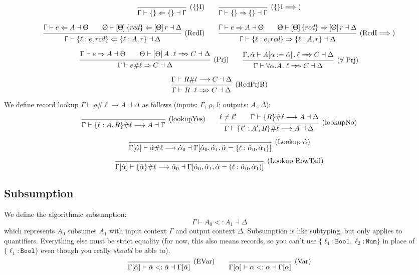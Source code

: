 \documentclass{article}
\newcommand{\rcd}[1]{\{#1\}}
\newcommand{\spc}{\qquad}
\newcommand{\ctx}{\Upgamma}
\newcommand{\ctxalt}{\Updelta}
\newcommand{\ctxaltt}{\Uptheta}
\newcommand{\lbl}{\ell}
\newcommand{\row}{r}
\newcommand{\ev}{\hat}
\newcommand{\ctxinout}[3]{#1 \vdash #2 \dashv #3}
\newcommand{\synth}[4]{\ctxinout {#1} {#2 \Rightarrow #3} {#4}}
\renewcommand{\check}[4]{\ctxinout {#1} {#2 \Leftarrow #3} {#4}}
\newcommand{\subsume}{<:}
\newcommand{\subsumes}[4]{\ctxinout {#1} {#2 \subsume #3} {#4}}
\newcommand{\synthesizes}{\Rightarrow \!\!\! \Rightarrow}
\newcommand{\presynth}[6]{\ctxinout {#1} {#2 #3 #4 \synthesizes #5} {#6}}
\newcommand{\B}{\mathcal{B}}
\newcommand{\prjSymbol}{.}
\newcommand{\prj}{\,\prjSymbol\,}
\newcommand{\apply}[1]{\left[#1\right]}
\newcommand{\lookup}[5]{#1 \vdash #2 \# #3 \longrightarrow #4 \dashv #5}
\newcommand{\deduct}[3][]
{
  \begin{prooftree}
    \hypo{#2}
    \infer1[\text{#1}]{#3}
  \end{prooftree}
}
\begin{document}
\[
\deduct[(\{\}I)]{}{\check{\ctx}{\{\}}{\{\}}{\ctx}}
\spc
\deduct[(\{\}I\(\implies\))]{}{\synth{\ctx}{\{\}}{\{\}}{\ctx}}
\]

\[
  \deduct[(RcdI)]
  { \check{\ctx}{e}{A}{\ctxaltt} \spc \check{\ctxaltt}{\apply\ctxaltt \rcd {rcd}}{\apply\ctxaltt\row}{\ctxalt} }
  { \check{\ctx}{\{\lbl : e , rcd \}}{\{\lbl : A, \row\}}{\ctxalt} }
  \spc
  \deduct[(RcdI\(\implies\))]
  { \synth{\ctx}{e}{A}{\ctxaltt} \spc \synth{\ctxaltt}{\apply\ctxaltt \rcd
        {rcd}}{\apply\ctxaltt \row}{\ctxalt} }
  { \synth{\ctx}{\{\lbl : e , rcd \}}{\{\lbl : A, \row\}}{\ctxalt} }
\]

\[
  \deduct[(Prj)]
  { \synth{\Gamma}{e}{A}{\Theta} \spc
    \presynth{\Theta}{\apply\Theta A}{\prj}{\lbl}{C}{\Delta}
  }
  { \synth{\Gamma}{e\#\lbl}{C}{\Delta} }
  \spc
  \deduct[(\(\forall\) Prj)]
  { \presynth{\Gamma, \ev\alpha}{A[\alpha := \ev\alpha]}{\prj}{\lbl}{C}{\Delta} }
  { \presynth{\Gamma}{\forall \alpha. A}{\prj}{\lbl}{C}{\Delta} }
\]

\[
  \deduct[(RcdPrjR)]
    { \lookup{\Gamma}{R}{l}{C}{\Delta} }
    { \presynth{\Gamma}{R}{\prj}{\lbl}{C}{\Delta} }
\]

\noindent
We define record lookup $\lookup{\Gamma}{\rho}{\lbl}{A}{\Delta}$ as follows (inputs: $\Gamma$, $\rho$, $l$; outputs: $A$, $\Delta$):
\[
\deduct[(lookupYes)]{}{\lookup{\Gamma}{\{\lbl : A, R\}}{\lbl}{A}{\Gamma}}
\spc
\deduct[(lookupNo)]
  {\lbl \neq \lbl' \spc \lookup{\Gamma}{\{R\}}{\lbl}{A}{\Delta}}
  {\lookup{\Gamma}{\{\lbl' : A', R\}}{\lbl}{A}{\Delta}}
\]

\[
\deduct[(Lookup \(\ev\alpha\))]
  { }
  { \lookup
      {\Gamma[\ev\alpha]}
      {\ev\alpha}
      {\lbl}
      {\ev\alpha_0}
      {\Gamma[\ev\alpha_0, \ev\alpha_1, \ev\alpha = \{\lbl : \ev\alpha_0, \ev\alpha_1\}] }
  }
\]

\[
\deduct[(Lookup RowTail)]
  { }
  { \lookup
      {\Gamma[\ev\alpha]}
      {\{\ev\alpha\}}
      {\lbl}
      {\ev\alpha_0}
      {\Gamma[\ev\alpha_0, \ev\alpha_1, \ev\alpha = (\lbl : \ev\alpha_0, \ev\alpha_1)] }
  }
\]

\subsection{Subsumption}
We define the algorithmic subsumption:
\[
\subsumes{\Gamma}{A_0}{A_1}{\Delta}
\]
which represents $A_0$ subsumes $A_1$ with input context $\Gamma$ and output
context $\Delta$. Subsumption is like subtyping, but only applies to
quantifiers. Everything else must be strict equality (for now, this also means
records, so you can't use \(\{\lbl_1: \texttt{Bool}, \lbl_2: \texttt{Num}\}\) in
place of \(\{\lbl_1 : \texttt{Bool}\}\) even though you really \emph{should} be
able to).
\[
  \deduct[(EVar)]{}{\subsumes{\Gamma[\ev\alpha]}{\ev\alpha}{\ev\alpha}{\Gamma[\ev\alpha]}}
  \spc
  \deduct[(Var)]{}{\subsumes{\Gamma[\alpha]}{\alpha}{\alpha}{\Gamma[\alpha]}}
\]
\end{document}
